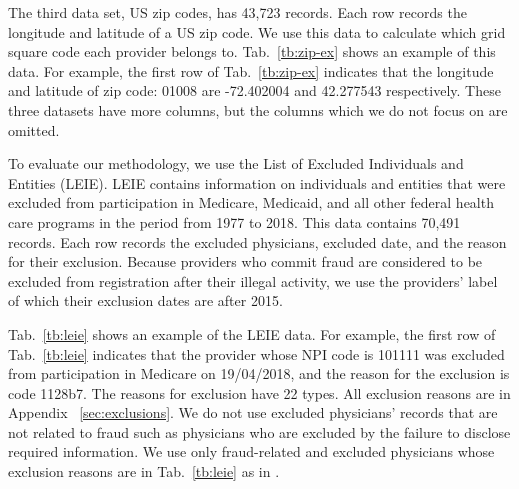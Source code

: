\documentclass[dvipdfmx, english]{ampmt}             %
\newcommand{\Tabref}[1]{Tab.~\ref{#1}}
\newcommand{\Appref}[1]{Appendix ~\ref{#1}}
\begin{document}
The third data set, US zip codes, has 43,723 records. Each row records the longitude and latitude of a US zip code. We use this data to calculate which grid square code\cite{ASato} each provider belongs to.
\Tabref{tb:zip-ex} shows an 
example of this data. For example, the first row of \Tabref{tb:zip-ex} indicates that the longitude and latitude of zip code: 01008 are -72.402004 and 42.277543 respectively. These three datasets have more columns, but the columns which we do not focus on are omitted.
\par

To evaluate our methodology, we use the List of Excluded Individuals and Entities (LEIE). LEIE contains information on individuals and entities that were excluded from participation in Medicare, Medicaid, and all other federal health care programs in the period from 1977 to 2018\cite{Leie}. This data contains 70,491 records. Each row records the excluded physicians, excluded date, and the reason for their exclusion. Because providers who commit fraud are considered to be excluded from registration after their illegal activity, we use 
the providers' label of which their exclusion dates are after 2015.

\Tabref{tb:leie} shows an example of the LEIE data. For example, the first row of \Tabref{tb:leie} indicates that the provider whose NPI code is 101111 was excluded from participation in Medicare on 19/04/2018, and the reason for the exclusion is code 1128b7. 
The reasons for exclusion have 22 types. All exclusion reasons are in \Appref{sec:exclusions}. We do not use excluded physicians' records that are not related to fraud such as physicians who are excluded by the failure to disclose required information.
We use only fraud-related and excluded physicians whose exclusion reasons are in \Tabref{tb:leie} as in \cite{TwoModels}. 
\end{document}
